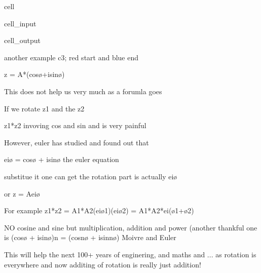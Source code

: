 \documentclass[letterpaper,10pt,english]{jupyterBook}
\begin{document}
\begin{sphinxuseclass}{cell}\begin{sphinxVerbatimInput}

\begin{sphinxuseclass}{cell_input}
\begin{sphinxVerbatim}[commandchars=\\\{\}]
 
 
   
\end{sphinxVerbatim}

\end{sphinxuseclass}\end{sphinxVerbatimInput}
\begin{sphinxVerbatimOutput}

\begin{sphinxuseclass}{cell_output}
\begin{sphinxVerbatim}[commandchars=\\\{\}]
another example \PYGZhy{} c3; red start and blue end
\end{sphinxVerbatim}

\end{sphinxuseclass}\end{sphinxVerbatimOutput}

\end{sphinxuseclass}
\begin{sphinxVerbatim}[commandchars=\\\{\}]
z = A*(cosø+isinø)

This does not help us very much as a forumla goes

If we rotate z1 and the z2

z1*z2 invoving cos and sin and is very painful

\PYGZhy{}\PYGZhy{}\PYGZhy{}\PYGZhy{} 

However, euler has studied and found out that

e\PYGZca{}iø = cosø + isinø  \PYGZlt{}\PYGZhy{}\PYGZhy{} the euler equation

substitue it one can get the rotation part is actually e\PYGZca{}iø

or z = Ae\PYGZca{}iø

For example z1*z2 = A1*A2(e\PYGZca{}iø1)(e\PYGZca{}iø2) = A1*A2*e\PYGZca{}i(ø1+ø2) 
        
             \PYGZlt{}\PYGZhy{}\PYGZhy{} NO cosine and sine but multiplication, addition and power
             (another thankful one is (cosø + isinø)\PYGZca{}n = (cosnø + isinnø) Moivre and Euler

This will help the next 100+ years of enginering, and maths and ... 
as rotation is everywhere and now additing of rotation is really just addition!
\end{sphinxVerbatim}
\end{document}

